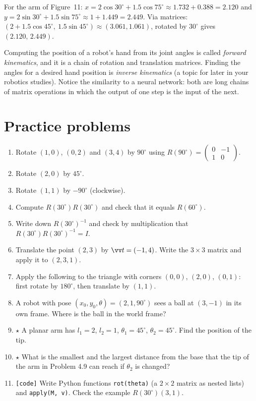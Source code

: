 \begin{example}
For the arm of Figure~11: $x=2\cos30^\circ+1.5\cos75^\circ\approx1.732+0.388=2.120$ and $y=2\sin30^\circ+1.5\sin75^\circ\approx1+1.449=2.449$. Via matrices: $(2+1.5\cos45^\circ,\ 1.5\sin45^\circ)\approx(3.061,1.061)$, rotated by $30^\circ$ gives $(2.120,\,2.449)$.
\end{example}

\begin{aibox}
Computing the position of a robot's hand from its joint angles is called \emph{forward kinematics}, and it is a chain of rotation and translation matrices. Finding the angles for a desired hand position is \emph{inverse kinematics} (a topic for later in your robotics studies). Notice the similarity to a neural network: both are long chains of matrix operations in which the output of one step is the input of the next.
\end{aibox}

\section*{Practice problems}
\begin{enumerate}[label=\textbf{\thechapter.\arabic*}]
  \item Rotate $(1,0)$, $(0,2)$ and $(3,4)$ by $90^\circ$ using $R(90^\circ)=\begin{pmatrix}0&-1\\1&0\end{pmatrix}$.
  \item Rotate $(2,0)$ by $45^\circ$.
  \item Rotate $(1,1)$ by $-90^\circ$ (clockwise).
  \item Compute $R(30^\circ)R(30^\circ)$ and check that it equals $R(60^\circ)$.
  \item Write down $R(30^\circ)^{-1}$ and check by multiplication that $R(30^\circ)R(30^\circ)^{-1}=I$.
  \item Translate the point $(2,3)$ by $\vv t=(-1,4)$. Write the $3\times3$ matrix and apply it to $(2,3,1)$.
  \item Apply the following to the triangle with corners $(0,0)$, $(2,0)$, $(0,1)$: first rotate by $180^\circ$, then translate by $(1,1)$.
  \item A robot with pose $(x_0,y_0,\theta)=(2,1,90^\circ)$ sees a ball at $(3,-1)$ in its own frame. Where is the ball in the world frame?
  \item $\star$ A planar arm has $l_1=2$, $l_2=1$, $\theta_1=45^\circ$, $\theta_2=45^\circ$. Find the position of the tip.
  \item $\star$ What is the smallest and the largest distance from the base that the tip of the arm in Problem 4.9 can reach if $\theta_2$ is changed?
  \item \texttt{[code]} Write Python functions \texttt{rot(theta)} (a $2\times2$ matrix as nested lists) and \texttt{apply(M, v)}. Check the example $R(30^\circ)(3,1)$.
\end{enumerate}

\newpage
